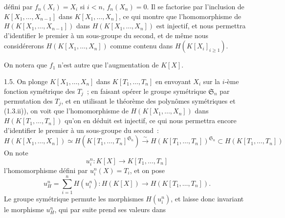 
défini par \(f_n(X_i)=X_i\) si \(i<n\), \(f_n(X_n)=0\). Il se factorise par l'inclusion de \(K[X_1,\ldots,X_{n-1}]\) dans \(K[X_1,\ldots,X_n]\), ce qui montre que l'homomorphisme de \(H(K[X_1,\ldots,X_{n-1}])\) dans \(H(K[X_1,\ldots,X_n])\) est injectif, et nous permettra d'identifier le premier à un sous-groupe du second, et de même nous considérerons \(H(K[X_1,\ldots,X_n])\) comme contenu dans \(H(K[X_i]_{i\geq 1})\).

On notera que \(f_1\) n'est autre que l'augmentation de \(K[X]\).

1.5. On plonge \(K[X_1,\ldots,X_n]\) dans \(K[T_1,\ldots,T_n]\) en envoyant \(X_i\) sur la \(i\)-ème fonction symétrique des \(T_j\)~; en faisant opérer le groupe symétrique \(\mathfrak S_n\) par permutation des \(T_j\), et en utilisant le théorème des polynômes symétriques et (1.3.ii)), on voit que l'homomorphisme de \(H(K[X_1,\ldots,X_n])\) dans \(H(K[T_1,\ldots,T_n])\) qu'on en déduit est injectif, ce qui nous permettra encore d'identifier le premier à un sous-groupe du second~:
\[
  H(K[X_1,\ldots,X_n])\simeq H(K[T_1,\ldots,T_n]^{\mathfrak S_n})\xrightarrow{\sim} H(K[T_1,\ldots,T_n])^{\mathfrak S_n}\subset H(K[T_1,\ldots,T_n])
\]%
On note
\[
  u_i^n:K[X]\longrightarrow K[T_1,\ldots,T_n]
\]
l'homomorphisme défini par \(u_i^n(X)=T_i\), et on pose
\[
  u_H^n=\sum_{i=1}^n H(u_i^n):H(K[X])\longrightarrow H(K[T_1,\ldots,T_n]).
\]
Le groupe symétrique permute les morphismes \(H(u_i^n)\), et laisse donc invariant le morphisme \(u_H^n\), qui par suite prend ses valeurs dans
